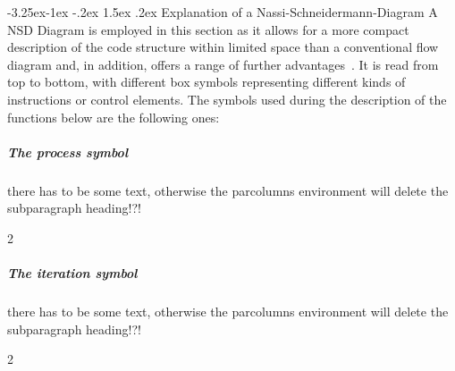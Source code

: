 \documentclass{report}
\makeatletter
\renewcommand\paragraph{\@startsection{paragraph}{4}{\z@}%
  {-3.25ex\@plus -1ex \@minus -.2ex}%
  {1.5ex \@plus .2ex}%
  {\normalfont\normalsize\bfseries}}
\makeatother
\begin{document}
\paragraph{Explanation of a Nassi-Schneidermann-Diagram}
A NSD Diagram is employed in this section as it allows for a more compact description of the code structure within limited space than a conventional flow diagram and, in addition, offers a range of further advantages~\cite{Nassi1973}. It is read from top to bottom, with different box symbols representing different kinds of instructions or control elements. The symbols used during the description of the functions below are the following ones:

\subparagraph{The process symbol}
there has to be some text, otherwise the parcolumns environment will delete the subparagraph heading!?!
\vspace{5mm}
\begin{parcolumns} [colwidths={1=60mm,2=35mm}] {2}  
 

\colplacechunks
\end{parcolumns}


%  
% 

\subparagraph{The iteration symbol}
there has to be some text, otherwise the parcolumns environment will delete the subparagraph heading!?!
\vspace{5mm}
\begin{parcolumns} [colwidths={1=60mm,2=35mm}] {2}  
 

\colplacechunks
\end{parcolumns}
\end{document}
